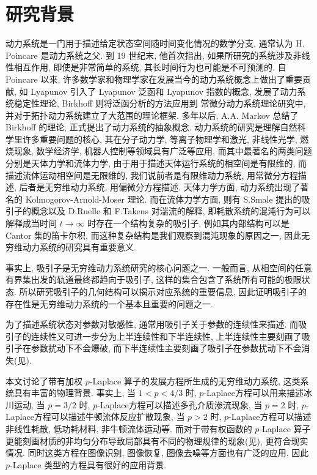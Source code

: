 \documentclass[oneside,longtitle]{LZUthesis}
\numberwithin{equation}{chapter}
\begin{document}
\section{研究背景}
动力系统是一门用于描述给定状态空间随时间变化情况的数学分支.
通常认为 H. Poincare 是动力系统之父.
到 19 世纪末, 他首次指出, 如果所研究的系统涉及非线性相互作用,
即使是非常简单的系统, 其长时间行为也可能是不可预测的.
自 Poincare 以来,
许多数学家和物理学家在发展当今的动力系统概念上做出了重要贡献,
如 Lyapunov 引入了 Lyapunov 泛函和 Lyapunov 指数的概念,
发展了动力系统稳定性理论, Birkhoff 则将泛函分析的方法应用到
常微分动力系统理论研究中, 并对于拓扑动力系统建立了大范围的理论框架.
多年以后, A.A. Markov 总结了 Birkhoff 的理论, 正式提出了动力系统的抽象概念.
动力系统的研究是理解自然科学里许多重要问题的核心,
其在分子动力学, 等离子物理学和激光, 非线性光学, 燃烧现象, 数学经济学, 机器人控制等领域具有广泛等应用,
而其中最著名的两类问题分别是天体力学和流体力学,
由于用于描述天体运行系统的相空间是有限维的, 而描述流体运动相空间是无限维的,
我们说前者是有限维动力系统, 用常微分方程描述, 后者是无穷维动力系统, 用偏微分方程描述.
天体力学方面, 动力系统出现了著名的 Kolmogorov-Arnold-Moser 理论.
而在流体力学方面, 则有 S.Smale 提出的吸引子的概念以及 D.Ruelle 和 F.Takens 对湍流的解释,
即耗散系统的混沌行为可以解释成当时间
$t \to \infty$ 时存在一个结构复杂的吸引子, 例如其内部结构可以是 Cantor 集的笛卡尔积,
而这种复杂结构是我们观察到混沌现象的原因之一, 因此无穷维动力系统的研究具有重要意义.

事实上, 吸引子是无穷维动力系统研究的核心问题之一.
一般而言, 从相空间的任意有界集出发的轨道最终都趋向于吸引子,
这样的集合包含了系统所有可能的极限状态.
所以研究吸引子的几何结构可以揭示对应系统的重要信息,
因此证明吸引子的存在性是无穷维动力系统的一个基本且重要的问题之一.

为了描述系统状态对参数对敏感性, 通常用吸引子关于参数的连续性来描述.
而吸引子的连续性又可进一步分为上半连续性和下半连续性, 上半连续性主要刻画了吸引子在参数扰动下不会爆破,
而下半连续性主要刻画了吸引子在参数扰动下不会消失(见\citep{robinsonInfiniteDimensionalDynamicalSystems2001a}).

本文讨论了带有加权 $p$-Laplace 算子的发展方程所生成的无穷维动力系统,
这类系统具有丰富的物理背景.
事实上, 当 $1 < p < 4/3$ 时, $p$-Laplace方程可以用来描述冰川运动,
当 $p = 3/2$ 时, $p$-Laplace方程可以描述多孔介质渗流现象,
当 $p = 2$ 时, $p$-Laplace方程可以描述牛顿流体反应扩散现象,
当 $p > 2$ 时, $p$-Laplace方程可以描述非线性耗散, 低功耗材料, 非牛顿流体运动等.
而对于带有权函数的 $p$-Laplace 算子更能刻画材质的非均匀分布导致局部具有不同的物理规律的现象(见\citep{lionsMathematicalTopicsFluid1996}),
更符合现实情况. 同时这类方程在图像识别, 图像恢复, 图像去噪等方面也有广泛的应用.
因此 $p$-Laplace 类型的方程具有很好的应用背景.
\end{document}

